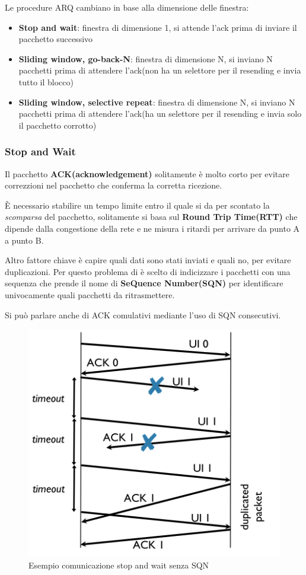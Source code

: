 Le procedure ARQ cambiano in base alla dimensione delle finestra:
\begin{itemize}
	\item \textbf{Stop and wait}: finestra di dimensione 1, si attende l'ack prima di inviare il pacchetto successivo
	\item \textbf{Sliding window, go-back-N}: finestra di dimensione N, si inviano N pacchetti prima di attendere l'ack(non ha un selettore per il resending e invia tutto il blocco)
	\item \textbf{Sliding window, selective repeat}: finestra di dimensione N, si inviano N pacchetti prima di attendere l'ack(ha un selettore per il resending e invia solo il pacchetto corrotto)
\end{itemize}


\subsubsection{Stop and Wait}

Il pacchetto \textbf{ACK(acknowledgement)} solitamente è molto corto per evitare
correzzioni nel pacchetto che conferma la corretta ricezione.

È necessario stabilire un tempo limite entro il quale si da per scontato
la \textit{scomparsa} del pacchetto, solitamente si basa sul \textbf{Round Trip Time(RTT)} che
dipende dalla congestione  della rete e ne misura i ritardi per arrivare da punto A a punto B.

Altro fattore chiave è capire quali dati sono stati inviati e quali no, per evitare
duplicazioni.
Per questo problema di è scelto di indicizzare i pacchetti con una sequenza che prende
il nome di \textbf{SeQuence Number(SQN)} per identificare univocamente quali pacchetti da ritrasmettere.

Si può parlare anche di ACK comulativi mediante l'uso di SQN consecutivi.

\begin{figure}[!ht]
	\centering
	\includegraphics[width=0.4\columnwidth]{./images/esempio_comunicazione_stop_wait_no_sqn.png}
	\caption{Esempio comunicazione stop and wait senza SQN}
	\label{fig:esempio_comunicazione_stop_wait_no_sqn}
\end{figure}


